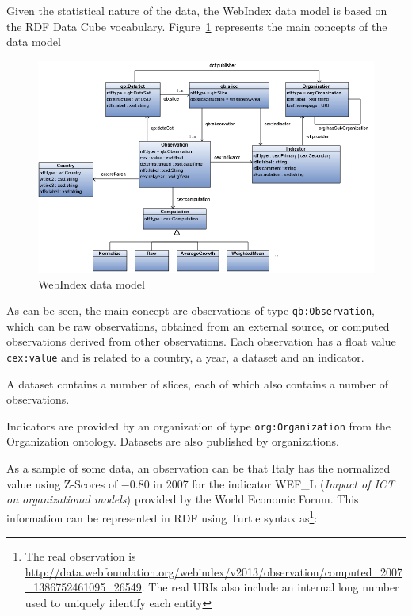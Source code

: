 \documentclass{llncs}
\begin{document}
Given the statistical nature of the data, the WebIndex data model is based on the RDF Data Cube vocabulary. Figure~\ref{Model} represents the main concepts of the data model

\begin{figure}[h]
\label{Model}
\begin{center}
\includegraphics[width=\textwidth]{Model}
\end{center}
\caption{WebIndex data model}
\end{figure}

As can be seen, the main concept are observations of type \lstinline|qb:Observation|, which 
can be raw observations,
obtained from an external source, 
or computed observations derived from other observations. 
Each observation has a float value \lstinline|cex:value| 
and is related to a country, a year, a dataset 
and an indicator.

A dataset contains a number of slices, each of which also contains a number of observations. 

Indicators are provided by an organization of type \lstinline|org:Organization| from the Organization ontology\cite{Organization14}. Datasets are also published by organizations. 

As a sample of some data, 
an observation can be that Italy has the normalized value using Z-Scores of $-0.80$ in 2007 for the indicator WEF\_L (\emph{Impact of ICT on organizational models}) provided by the World Economic Forum. 
This information can be represented in RDF using Turtle syntax as\footnote{The real observation is \url{http://data.webfoundation.org/webindex/v2013/observation/computed_2007_1386752461095_26549}. The real URIs also include an internal long number used to uniquely identify each entity}:
\end{document}
